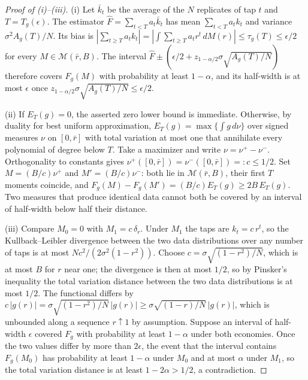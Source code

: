 \begin{proof}[Proof of (i)--(iii)]
(i) Let $\bar k_t$ be the average of the $N$ replicates of tap $t$ and $T=T_g(\epsilon)$. The estimator $\hat F=\sum_{t<T}a_t\bar k_t$ has mean $\sum_{t<T}a_tk_t$ and variance $\sigma^2A_g(T)/N$. Its bias is $|\sum_{t\ge T}a_tk_t|=|\int\sum_{t\ge T}a_tr^t\,dM(r)|\le\tau_g(T)\le\epsilon/2$ for every $M\in\mathcal M(\bar r,B)$. The interval $\hat F\pm(\epsilon/2+z_{1-\alpha/2}\sigma\sqrt{A_g(T)/N})$ therefore covers $F_g(M)$ with probability at least $1-\alpha$, and its half-width is at most $\epsilon$ once $z_{1-\alpha/2}\sigma\sqrt{A_g(T)/N}\le\epsilon/2$.

(ii) If $E_T(g)=0$, the asserted zero lower bound is immediate. Otherwise, by duality for best uniform approximation, $E_T(g)=\max\{\int g\,d\nu\}$ over signed measures $\nu$ on $[0,\bar r]$ with total variation at most one that annihilate every polynomial of degree below $T$. Take a maximizer and write $\nu=\nu^+-\nu^-$. Orthogonality to constants gives $\nu^+([0,\bar r])=\nu^-([0,\bar r])=:c\le1/2$. Set $M=(B/c)\nu^+$ and $M'=(B/c)\nu^-$: both lie in $\mathcal M(\bar r,B)$, their first $T$ moments coincide, and $F_g(M)-F_g(M')=(B/c)E_T(g)\ge2B\,E_T(g)$. Two measures that produce identical data cannot both be covered by an interval of half-width below half their distance.

(iii) Compare $M_0=0$ with $M_1=c\,\delta_r$. Under $M_1$ the taps are $k_t=c\,r^t$, so the Kullback--Leibler divergence between the two data distributions over any number of taps is at most $Nc^2/(2\sigma^2(1-r^2))$. Choose $c=\sigma\sqrt{(1-r^2)/N}$, which is at most $B$ for $r$ near one; the divergence is then at most $1/2$, so by Pinsker's inequality the total variation distance between the two data distributions is at most $1/2$. The functional differs by $c\,|g(r)|=\sigma\sqrt{(1-r^2)/N}\,|g(r)|\ge\sigma\sqrt{(1-r)/N}\,|g(r)|$, which is unbounded along a sequence $r\uparrow1$ by assumption. Suppose an interval of half-width $\epsilon$ covered $F_g$ with probability at least $1-\alpha$ under both economies. Once the two values differ by more than $2\epsilon$, the event that the interval contains $F_g(M_0)$ has probability at least $1-\alpha$ under $M_0$ and at most $\alpha$ under $M_1$, so the total variation distance is at least $1-2\alpha>1/2$, a contradiction.
\end{proof}

